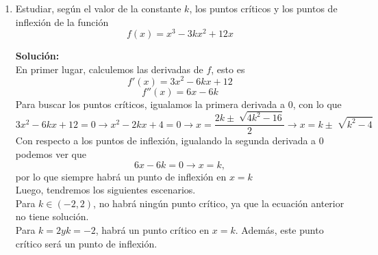 \documentclass[12pt]{article}
\newenvironment{solucion}
{\begin{mdframed}[backgroundcolor=black!10]
		{\bf Solución:}\\
	}
	{
	\end{mdframed}
}
\newenvironment{preguntas}
{\begin{enumerate}\itemsep12pt
	}
	{
	\end{enumerate}
}
\newcommand{\ra}{\rightarrow}
\begin{document}
\begin{preguntas}
$$f(x) = \dfrac{|x|}{1+x^2}$$
en el intervalo $x \in [-3,2]$
\begin{solucion}
Notemos que podemos escribir $f(x)$ como
$$f(x)= \begin{cases}
\dfrac{x}{1+x^2} & x \geq 0\\\\
\dfrac{-x}{1+x^2} & x < 0
\end{cases}$$
Esta función no es derivable en $x=0$, sin embargo, podemos derivar a ambos lados y luego ver que ocurre. Entonces, derivando ambos lados por separado, tenemos que
$$x > 0 \ra f'(x) = \dfrac{(1+x^2) - 2x^2}{(1+x^2)^2} = \dfrac{1-x^2}{(1+x^2)^2} = \dfrac{(1+x)(1-x)}{(1+x^2)^2}$$
$$x < 0 \ra f'(x) = \dfrac{-(1+x^2) + 2x^2}{(1+x^2)^2} = \dfrac{x^2-1}{(1+x^2)^2} = \dfrac{(x+1)(x-1)}{(1+x^2)^2}$$
De aquí, obtenemos los puntos $x=1$ y $x=-1$ como puntos críticos. Además, debemos agregar a los puntos críticos, los bordes de nuestro intervalo y el punto donde la función no es derivable, es decir, $x=-3$, $x=2$ y $x=0$.\\

Ahora, evaluamos en cada uno de ellos, obteniendo
$$f(-3) = \dfrac{3}{10},\ f(-1) = \dfrac{1}{2}, \ f(0) = 0, \ f(1) = \dfrac{1}{2}, \ f(2) = \dfrac{2}{5}$$
Finalmente, el máximo es $\dfrac{1}{2}$ y el mínimo es $0$.
\end{solucion}
\item Estudiar, según el valor de la constante $k$, los puntos críticos y los puntos de inflexión de la función
$$f(x) = x^3-3kx^2+12x$$
\begin{solucion}
En primer lugar, calculemos las derivadas de $f$, esto es
$$f'(x) = 3x^2 - 6kx + 12$$
$$f''(x) = 6x - 6k$$
Para buscar los puntos críticos, igualamos la primera derivada a 0, con lo que
$$3x^2 - 6kx + 12 = 0 \ra x^2 - 2kx + 4= 0 \ra x = \dfrac{2k \pm \sqrt[]{4k^2-16}}{2} \ra x = k \pm \sqrt[]{k^2-4}$$
Con respecto a los puntos de inflexión, igualando la segunda derivada a 0 podemos ver que
$$6x- 6k = 0 \ra x = k,$$
por lo que siempre habrá un punto de inflexión en $x=k$\\

Luego, tendremos los siguientes escenarios.\\

Para $k \in (-2,2)$, no habrá ningún punto crítico, ya que la ecuación anterior no tiene solución.\\

Para $k = 2 y k = -2$, habrá un punto crítico en $x=k$. Además, este punto crítico será un punto de inflexión.\\


\end{solucion}
\end{preguntas}
\end{document}
